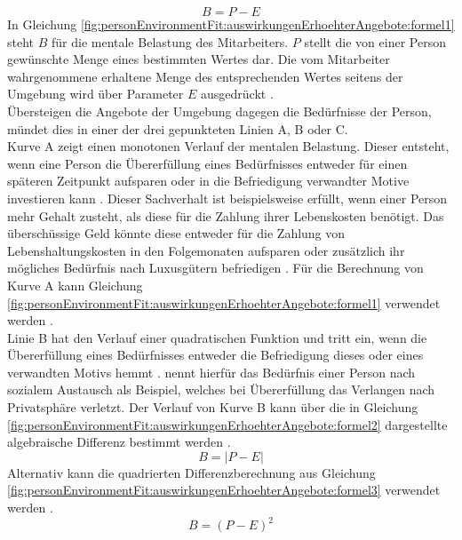 \begin{equation}
	B = P - E
	\label{fig:personEnvironmentFit:auswirkungenErhoehterAngebote:formel1}
\end{equation}
In Gleichung \ref{fig:personEnvironmentFit:auswirkungenErhoehterAngebote:formel1} steht $B$ für die mentale Belastung des Mitarbeiters. $P$ stellt die von einer Person gewünschte Menge eines bestimmten Wertes dar. Die vom Mitarbeiter wahrgenommene erhaltene Menge des entsprechenden Wertes seitens der Umgebung wird über Parameter $E$ ausgedrückt \cite[S. 2]{edwards:1993}.\\
Übersteigen die Angebote der Umgebung dagegen die Bedürfnisse der Person, mündet dies in einer der drei gepunkteten Linien A, B oder C.\\
Kurve A zeigt einen monotonen Verlauf der mentalen Belastung. Dieser entsteht, wenn eine Person die Übererfüllung eines Bedürfnisses entweder für einen späteren Zeitpunkt aufsparen oder in die Befriedigung verwandter Motive investieren kann \cite{mechanismsOfJobStressAndStrain:1982}. Dieser Sachverhalt ist beispielsweise erfüllt, wenn einer Person mehr Gehalt zusteht, als diese für die Zahlung ihrer Lebenskosten benötigt. Das überschüssige Geld könnte diese entweder für die Zahlung von Lebenshaltungskosten in den Folgemonaten aufsparen oder zusätzlich ihr mögliches Bedürfnis nach Luxusgütern befriedigen \cite[S. 21]{edwards:2008}. Für die Berechnung von Kurve A kann Gleichung \ref{fig:personEnvironmentFit:auswirkungenErhoehterAngebote:formel1} verwendet werden \cite[S. 2]{edwards:1993}.\\
Linie B hat den Verlauf einer quadratischen Funktion und tritt ein, wenn die Übererfüllung eines Bedürfnisses entweder die Befriedigung dieses oder eines verwandten Motivs hemmt \cite[S. 5]{caplan:1987}. \textcite{harrison:1978} nennt hierfür das Bedürfnis einer Person nach sozialem Austausch als Beispiel, welches bei Übererfüllung das Verlangen nach Privatsphäre verletzt. Der Verlauf von Kurve B kann über die in Gleichung \ref{fig:personEnvironmentFit:auswirkungenErhoehterAngebote:formel2} dargestellte algebraische Differenz bestimmt werden \cite[S. 2]{edwards:1993}.
\begin{equation}
	B = |P - E|
	\label{fig:personEnvironmentFit:auswirkungenErhoehterAngebote:formel2}
\end{equation}
Alternativ kann die quadrierten Differenzberechnung aus Gleichung \ref{fig:personEnvironmentFit:auswirkungenErhoehterAngebote:formel3} verwendet werden \cite[S. 2]{edwards:1993}.
\begin{equation}
	B = (P - E)^2
	\label{fig:personEnvironmentFit:auswirkungenErhoehterAngebote:formel3}
\end{equation}
